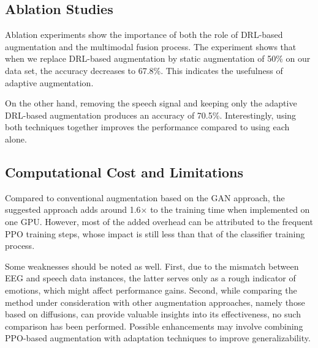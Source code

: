 \documentclass[conference]{IEEEtran}
\begin{document}
\subsection{Ablation Studies}
Ablation experiments show the importance of both the role of DRL-based augmentation and the multimodal fusion process. The experiment shows that when we replace DRL-based augmentation by static augmentation of 50\% on our data set, the accuracy decreases to 67.8\%. This indicates the usefulness of adaptive augmentation.

On the other hand, removing the speech signal and keeping only the adaptive DRL-based augmentation produces an accuracy of 70.5\%. Interestingly, using both techniques together improves the performance compared to using each alone.

\subsection{Computational Cost and Limitations}
Compared to conventional augmentation based on the GAN approach, the suggested approach adds around 1.6× to the training time when implemented on one GPU. However, most of the added overhead can be attributed to the frequent PPO training steps, whose impact is still less than that of the classifier training process.

Some weaknesses should be noted as well. First, due to the mismatch between EEG and speech data instances, the latter serves only as a rough indicator of emotions, which might affect performance gains. Second, while comparing the method under consideration with other augmentation approaches, namely those based on diffusions, can provide valuable insights into its effectiveness, no such comparison has been performed. Possible enhancements may involve combining PPO-based augmentation with adaptation techniques to improve generalizability.
\end{document}
